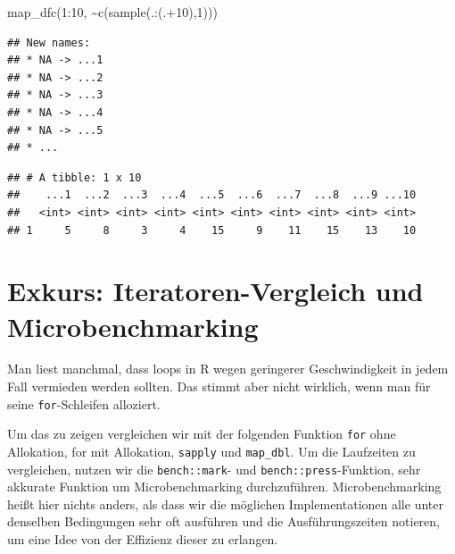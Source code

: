 \documentclass[
]{book}
\newenvironment{Shaded}{\begin{snugshade}}{\end{snugshade}}
\newcommand{\DecValTok}[1]{\textcolor[rgb]{0.00,0.00,0.81}{#1}}
\newcommand{\FunctionTok}[1]{\textcolor[rgb]{0.00,0.00,0.00}{#1}}
\newcommand{\NormalTok}[1]{#1}
\newcommand{\SpecialCharTok}[1]{\textcolor[rgb]{0.00,0.00,0.00}{#1}}
\begin{document}
\begin{Shaded}
\begin{Highlighting}[]
\FunctionTok{map\_dfc}\NormalTok{(}\DecValTok{1}\SpecialCharTok{:}\DecValTok{10}\NormalTok{, }\SpecialCharTok{\textasciitilde{}}\FunctionTok{c}\NormalTok{(}\FunctionTok{sample}\NormalTok{(.}\SpecialCharTok{:}\NormalTok{(.}\SpecialCharTok{+}\DecValTok{10}\NormalTok{),}\DecValTok{1}\NormalTok{)))}
\end{Highlighting}
\end{Shaded}

\begin{verbatim}
## New names:
## * NA -> ...1
## * NA -> ...2
## * NA -> ...3
## * NA -> ...4
## * NA -> ...5
## * ...
\end{verbatim}

\begin{verbatim}
## # A tibble: 1 x 10
##    ...1  ...2  ...3  ...4  ...5  ...6  ...7  ...8  ...9 ...10
##   <int> <int> <int> <int> <int> <int> <int> <int> <int> <int>
## 1     5     8     3     4    15     9    11    15    13    10
\end{verbatim}

\hypertarget{exkurs-iteratoren-vergleich-und-microbenchmarking}{%
\section{Exkurs: Iteratoren-Vergleich und Microbenchmarking}\label{exkurs-iteratoren-vergleich-und-microbenchmarking}}

Man liest manchmal, dass loops in R wegen geringerer Geschwindigkeit in jedem Fall vermieden werden sollten. Das stimmt aber nicht wirklich, wenn man für seine \texttt{for}-Schleifen alloziert.

Um das zu zeigen vergleichen wir mit der folgenden Funktion \texttt{for} ohne Allokation, for mit Allokation, \texttt{sapply} und \texttt{map\_dbl}. Um die Laufzeiten zu vergleichen, nutzen wir die \texttt{bench::mark}- und \texttt{bench::press}-Funktion, sehr akkurate Funktion um Microbenchmarking durchzuführen.
Microbenchmarking heißt hier nichts anders, als dass wir die möglichen Implementationen alle unter denselben Bedingungen sehr oft ausführen und die Ausführungszeiten notieren, um eine Idee von der Effizienz dieser zu erlangen.
\end{document}
